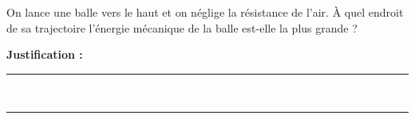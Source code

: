 On lance une balle vers le haut et on néglige la résistance de l'air. À quel endroit de sa trajectoire l'énergie mécanique de la balle est-elle la plus grande ?

\choices

\noindent\textbf{Justification :} \hrulefill \\[2.5ex]
\rule{\linewidth}{0.4pt} \\[2.5ex]
\rule{\linewidth}{0.4pt}
\vfill
